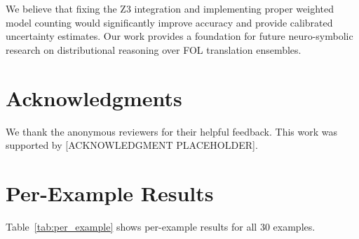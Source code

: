 \documentclass[11pt,letterpaper]{article}
\begin{document}
We believe that fixing the Z3 integration and implementing proper weighted model counting would significantly improve accuracy and provide calibrated uncertainty estimates. Our work provides a foundation for future neuro-symbolic research on distributional reasoning over FOL translation ensembles.

\section*{Acknowledgments}

We thank the anonymous reviewers for their helpful feedback. This work was supported by [ACKNOWLEDGMENT PLACEHOLDER].




\appendix

\section{Per-Example Results}

Table~\ref{tab:per_example} shows per-example results for all 30 examples.
\end{document}
